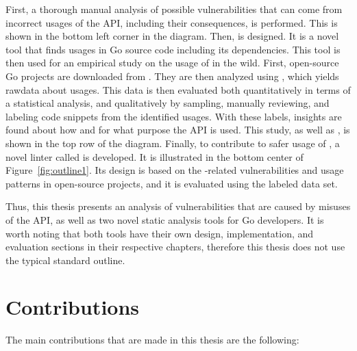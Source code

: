 
First, a thorough manual analysis of possible vulnerabilities that can come from incorrect usages of the \unsafe{}
\acrshort{API}, including their consequences, is performed.
This is shown in the bottom left corner in the diagram.
Then, \toolGeiger{} is designed.
It is a novel tool that finds \unsafe{} usages in Go source code including its dependencies.
This tool is then used for an empirical study on the usage of \unsafe{} in the wild.
First, open-source Go projects are downloaded from \github{}.
They are then analyzed using \toolGeiger{}, which yields rawdata about \unsafe{} usages.
This data is then evaluated both quantitatively in terms of a statistical analysis, and qualitatively by sampling,
manually reviewing, and labeling code snippets from the identified \unsafe{} usages.
With these labels, insights are found about how and for what purpose the \unsafe{} \acrshort{API} is used.
This study, as well as \toolGeiger{}, is shown in the top row of the diagram.
Finally, to contribute to safer usage of \unsafe{}, a novel linter called \toolSafer{} is developed.
It is illustrated in the bottom center of Figure~\ref{fig:outline1}.
Its design is based on the \unsafe{}-related vulnerabilities and \unsafe{} usage patterns in open-source projects,
and it is evaluated using the labeled data set.

Thus, this thesis presents an analysis of vulnerabilities that are caused by misuses of the \unsafe{} \acrshort{API},
as well as two novel static analysis tools for Go developers.
It is worth noting that both tools have their own design, implementation, and evaluation sections in their respective
chapters, therefore this thesis does not use the typical standard outline.



\section{Contributions}\label{sec:introduction:contributions}

The main contributions that are made in this thesis are the following:

